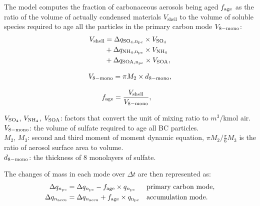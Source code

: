 \documentclass[12pt, fullpage]{uiucthesis2009}
\begin{document}
	The model computes the fraction of carbonaceous aerosols being aged $f_{\rm{age}}$ as the ratio of the volume of actually condensed materials $V_\text{shell}$ to the volume of soluble species required to age all the particles in the primary carbon mode $V_{\rm{8-mono}}$:
	\begin{align}
	\begin{split}
	V_{\rm{shell}} &=  \Delta q_{\rm{SO_4}, n_{\rm{pc}}} \times V_{\rm{SO_4}} \\
	&+ \Delta q_{\rm{NH_4}, n_{\rm{pc}}} \times V_{\rm{NH_4}} \\
	&+ \Delta q_{\rm{SOA}, n_{\rm{pc}}} \times V_{\rm{SOA}}, 
	\end{split}
	\end{align}
	
	\begin{align}
	\begin{split}
	V_{\rm{8-mono}} = \pi M_2 \times d_{\rm{8-mono}},
	\end{split}
	\end{align}
	
	\begin{align}
	f_{\rm{age}} &= \frac{V_{\rm{shell}}}{V_{\rm{8-mono}}},  
	\end{align}
	
	\begin{flushleft}
		$V_{\rm{SO_4}}$, $V_{\rm{NH_4}}$, $V_{\rm{SOA}}$: factors that convert the unit of mixing ratio to $m^3/$kmol air. \\
		$V_{\rm{8-mono}}$: the volume of sulfate required to age all BC particles. \\
		$M_2$, $M_3$: second and third moment of  moment dynamic equation, $\pi M_2/ \frac{\pi}{6}M_3$ is the ratio of aerosol surface area to volume. \\
		$d_{\rm{8-mono}}$: the thickness of 8 monolayers of sulfate.
	\end{flushleft}
	
	The changes of mass in each mode over $\Delta t$ are then represented as:
	\begin{align}
	\Delta q_{n_{\rm{pc}}} &= \Delta q_{n_{\rm{pc}}} - f_{\rm{age}} \times q_{n_{\rm{pc}}}  &&\text{primary carbon mode}, \\
	\Delta q_{n_{\rm{accu}}} &= \Delta q_{n_{\rm{accu}}} + f_{\rm{age}} \times q_{\rm{n_{\rm{pc}}}}  &&\text{accumulation mode}.
	\end{align}
	
\end{document}
